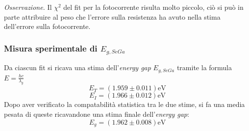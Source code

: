 \textit{Osservazione.} Il $\chi ^2$ del fit per la fotocorrente risulta molto piccolo, ciò si può in parte attribuire al peso che l'errore sulla resistenza ha avuto nella stima dell'errore sulla fotocorrente.




\subsubsection{Misura sperimentale di $E_{g,SeGa}$}
Da ciascun fit si ricava una stima dell'\textit{energy gap} $E_{g,SeGa}$ tramite la formula $ E=\frac{hc}{\lambda_g} $
$$ E_T = (1.959 \pm0.011) \text{eV} $$ 
$$ E_I = (1.966 \pm 0.012)\text{eV}$$  
Dopo aver verificato la compatabilità statistica tra le due stime, si fa una media pesata  di queste ricavandone una stima finale dell'\textit{energy gap}:
$$E_g= (1.962 \pm 0.008)\text{eV}$$  
